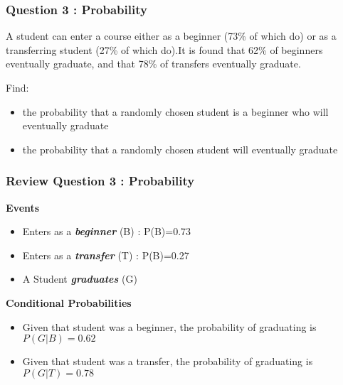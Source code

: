 \documentclass[a4]{beamer}
\begin{document}
\begin{frame}
\frametitle{Question 3 :  Probability}
A student can enter a course either as a beginner (73\% of which do) or as a transferring
student (27\% of which do).It is found that 62\% of beginners eventually graduate, and that
78\% of transfers eventually graduate.


Find:
\begin{itemize}
\item the probability that a randomly chosen student is a beginner who will
eventually graduate
\item the probability that a randomly chosen student will eventually graduate
\end{itemize}
\end{frame}
\begin{frame}
\frametitle{Review Question 3 :  Probability}
\textbf{Events}

\begin{itemize}
\item Enters as a \textbf{\emph{beginner}} (B) : P(B)=0.73
\item Enters as a \textbf{\emph{transfer}} (T) : P(B)=0.27
\item A Student \textbf{\emph{graduates}} (G)
\end{itemize}
\textbf{Conditional Probabilities}
\begin{itemize}
\item Given that student was a beginner, the probability of graduating is $P(G|B) = 0.62$
\item Given that student was a transfer, the probability of graduating is $P(G|T) = 0.78$
\end{itemize}
\end{frame}
\end{document}
